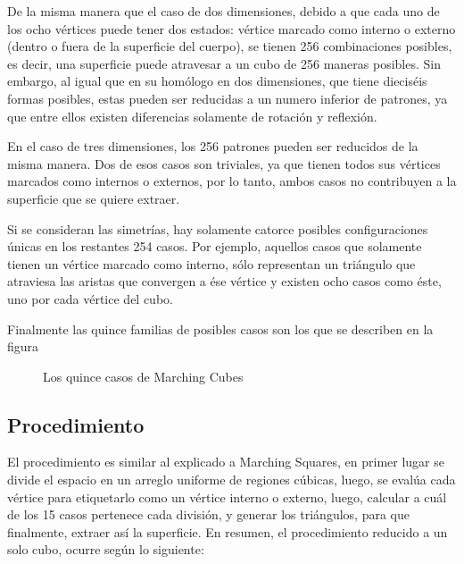 De la misma manera que el caso de dos dimensiones, debido a que cada uno de los ocho 
vértices puede tener dos estados: vértice marcado como interno o externo (dentro o fuera de la 
superficie del cuerpo), se tienen 256 combinaciones posibles, es decir, una superficie puede
atravesar a un cubo de 256 maneras posibles. Sin embargo, al igual que en su homólogo en dos 
dimensiones, que tiene dieciséis formas posibles, estas pueden ser reducidas a un numero inferior 
de patrones, ya que entre ellos existen diferencias solamente de rotación y reflexión.

En el caso de tres dimensiones, los 256 patrones pueden ser reducidos de la misma 
manera. Dos de esos casos son triviales, ya que tienen todos sus vértices marcados como internos 
o externos, por lo tanto, ambos casos no contribuyen a la superficie que se quiere extraer.

Si se consideran las simetrías, hay solamente catorce posibles configuraciones únicas en 
los restantes 254 casos. Por ejemplo, aquellos casos que solamente tienen un vértice marcado 
como interno, sólo representan un triángulo que atraviesa las aristas que convergen a ése vértice y 
existen ocho casos como éste, uno por cada vértice del cubo.

Finalmente las quince familias de posibles casos son los que se describen en la figura \label{f:estadoDelArte:MarchingCubes}

\begin{figure}[hbp]
\centering
\caption{Los quince casos de Marching Cubes}
\label{f:estadoDelArte:MarchingCubes}
\end{figure}

\subsection{Procedimiento}
\label{subsec:procedimiento}

El procedimiento es similar al explicado a Marching Squares, en primer lugar se divide el 
espacio en un arreglo uniforme de regiones cúbicas, luego, se evalúa cada vértice para etiquetarlo 
como un vértice interno o externo, luego, calcular a cuál de los 15 casos pertenece cada división, 
y generar los triángulos, para que finalmente, extraer así la superficie.
En resumen, el procedimiento reducido a un solo cubo, ocurre según lo siguiente:



